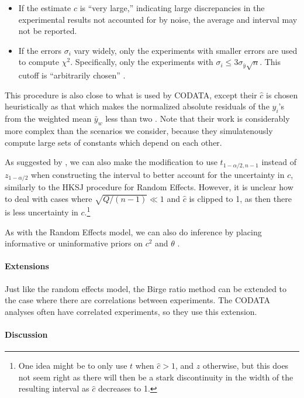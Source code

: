 \documentclass[letterpaper,12pt]{article}
\begin{document}
\begin{itemize}

\item
  If the estimate $\hat c$ is ``very large,'' indicating large discrepancies in the experimental results not accounted for by noise, the average and interval may not be reported.
\item
  If the errors $\sigma_i$ vary widely, only the experiments with smaller errors are used to compute $\chi^2$. Specifically, only the experiments with $\sigma_i\leq 3\sigma_{\bar y}\sqrt{n}$. This cutoff is ``arbitrarily chosen'' \citep[Section 5.2.2]{navas2024review}.
\end{itemize}

This procedure is also close to what is used by CODATA, except their $\hat c$ is chosen heuristically as that which makes the normalized absolute residuals of the $y_i$'s from the weighted mean $\bar y_w$ less than two \citep{tiesinga2021codata}. Note that their work is considerably more complex than the scenarios we consider, because they simulatenously compute large sets of constants which depend on each other.

As suggested by \citet{jackson2013meta}, we can also make the modification to use $t_{1-\alpha/2,n-1}$ instead of $z_{1-\alpha/2}$ when constructing the interval to better account for the uncertainty in $c$, similarly to the HKSJ procedure for Random Effects. However, it is unclear how to deal with cases where $\sqrt{Q/(n-1)}\ll1$ and $\hat{c}$ is clipped to 1, as then there is less uncertainty in $c$.\footnote{One idea might be to only use $t$ when $\hat{c}>1$, and $z$ otherwise, but this does not seem right as there will then be a stark discontinuity in the width of the resulting interval as $\hat{c}$ decreases to 1.}

As with the Random Effects model, we can also do inference by placing informative or uninformative priors on $c^2$ and $\theta$ \citep{bodnar2014adjustment}.

\paragraph{Extensions}\label{extensions-1}

Just like the random effects model, the Birge ratio method can be extended to the case where there are correlations between experiments. The CODATA analyses often have correlated experiments, so they use this extension.

\paragraph{Discussion}\label{discussion}
\end{document}
